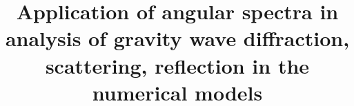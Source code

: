 



\title{Application of angular spectra in analysis of gravity wave diffraction, scattering, reflection in the numerical models}
\maketitle

